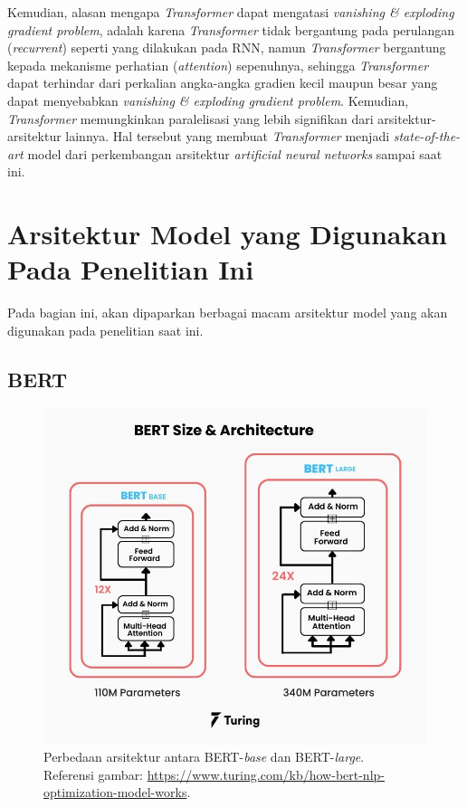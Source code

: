 Kemudian, alasan mengapa \emph{Transformer} dapat mengatasi \emph{vanishing \& exploding gradient problem}, adalah karena \emph{Transformer} tidak bergantung pada perulangan (\emph{recurrent}) seperti yang dilakukan pada RNN, namun \emph{Transformer} bergantung kepada mekanisme perhatian (\emph{attention}) sepenuhnya, sehingga \emph{Transformer} dapat terhindar dari perkalian angka-angka gradien kecil maupun besar yang dapat menyebabkan \emph{vanishing \& exploding gradient problem}. Kemudian, \emph{Transformer} memungkinkan paralelisasi yang lebih signifikan dari arsitektur-arsitektur lainnya. Hal tersebut yang membuat \emph{Transformer} menjadi \emph{state-of-the-art} model dari perkembangan arsitektur \emph{artificial neural networks} sampai saat ini.

\section{Arsitektur Model yang Digunakan Pada Penelitian Ini}
Pada bagian ini, akan dipaparkan berbagai macam arsitektur model yang akan digunakan pada penelitian saat ini.

\subsection{BERT}

\begin{figure}[h]
\includegraphics[scale=0.5]{assets/pics/bert.png}
\centering
\caption{Perbedaan arsitektur antara BERT-\emph{base} dan BERT-\emph{large}.\\\hspace{\textwidth}Referensi gambar: \url{https://www.turing.com/kb/how-bert-nlp-optimization-model-works}.}
\end{figure}

